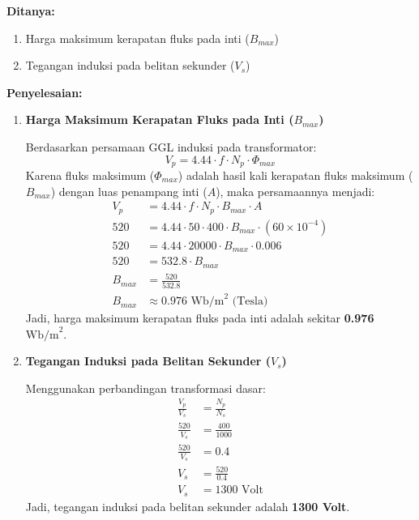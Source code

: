 \documentclass[12pt, a4paper]{article}
\begin{document}
\textbf{Ditanya:}
\begin{enumerate}[label=\alph*.]
    \item Harga maksimum kerapatan fluks pada inti ($B_{max}$)
    \item Tegangan induksi pada belitan sekunder ($V_s$)
\end{enumerate}

\textbf{Penyelesaian:}

\begin{enumerate}[label=\alph*.]
    \item \textbf{Harga Maksimum Kerapatan Fluks pada Inti ($B_{max}$)}

    Berdasarkan persamaan GGL induksi pada transformator:
    \[
        V_p = 4.44 \cdot f \cdot N_p \cdot \Phi_{max}
    \]
    Karena fluks maksimum ($\Phi_{max}$) adalah hasil kali kerapatan fluks maksimum ($B_{max}$) dengan luas penampang inti ($A$), maka persamaannya menjadi:
    \begin{align*}
        V_p &= 4.44 \cdot f \cdot N_p \cdot B_{max} \cdot A \\
        520 &= 4.44 \cdot 50 \cdot 400 \cdot B_{max} \cdot (60 \times 10^{-4}) \\
        520 &= 4.44 \cdot 20000 \cdot B_{max} \cdot 0.006 \\
        520 &= 532.8 \cdot B_{max} \\
        B_{max} &= \frac{520}{532.8} \\
        B_{max} &\approx 0.976 \text{ Wb/m}^2 \text{ (Tesla)}
    \end{align*}
    Jadi, harga maksimum kerapatan fluks pada inti adalah sekitar \textbf{0.976 $\text{Wb/m}^2$}.

    \item \textbf{Tegangan Induksi pada Belitan Sekunder ($V_s$)}

    Menggunakan perbandingan transformasi dasar:
    \begin{align*}
        \frac{V_p}{V_s} &= \frac{N_p}{N_s} \\
        \frac{520}{V_s} &= \frac{400}{1000} \\
        \frac{520}{V_s} &= 0.4 \\
        V_s &= \frac{520}{0.4} \\
        V_s &= 1300 \text{ Volt}
    \end{align*}
    Jadi, tegangan induksi pada belitan sekunder adalah \textbf{1300 Volt}.
\end{enumerate}
\end{document}
